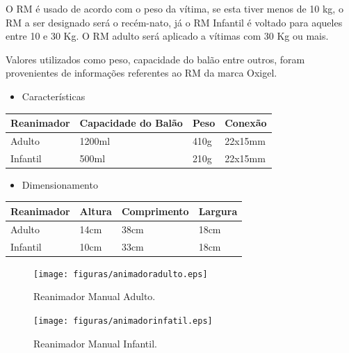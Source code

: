 O RM é usado de acordo com o peso da vítima, se esta tiver menos de 10 kg, o RM a ser designado será o recém-nato, já o RM Infantil é voltado para aqueles entre 10 e 30 Kg. O RM adulto será aplicado a vítimas com 30 Kg ou mais.

Valores utilizados como peso, capacidade do balão entre outros, foram provenientes de informações referentes ao RM da marca Oxigel.

\begin{itemize}
	\item Características
\end{itemize}

\begin{table}[h]
\begin{tabular}{|l|l|l|l|}
\hline
\multicolumn{1}{|c|}{Reanimador} & Capacidade do Balão & Peso & Conexão \\ \hline
Adulto                           & 1200ml              & 410g & 22x15mm \\ \hline
Infantil                         & 500ml               & 210g & 22x15mm \\ \hline
\end{tabular}
\end{table}


\begin{itemize}
	\item Dimensionamento
\end{itemize}

\begin{table}[h]
\begin{tabular}{|l|l|l|l|}
\hline
\multicolumn{1}{|c|}{Reanimador} & Altura & Comprimento & Largura \\ \hline
Adulto                           & 14cm   & 38cm        & 18cm    \\ \hline
Infantil                         & 10cm   & 33cm        & 18cm    \\ \hline
\end{tabular}
\end{table}

\begin{figure}[h!]
	\centering
	  \texttt{[image: figuras/animadoradulto.eps]}
	\caption{Reanimador Manual Adulto.}
	\label{fig:animadoradulto}
\end{figure}

\begin{figure}[h!]
	\centering
	  \texttt{[image: figuras/animadorinfatil.eps]}
	\caption{ Reanimador Manual Infantil.}
	\label{fig:animadorinfatil}
\end{figure}

